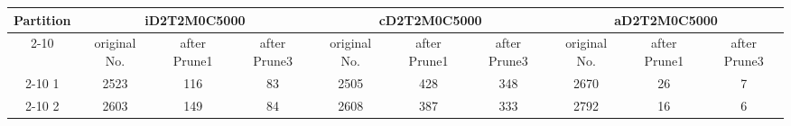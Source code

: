 \begin{table*}[t]
  \centering
\makeatletter
    \long{}
\makeatother
  \caption{2 partitions in Three Dimension}
    \vspace*{3pt}
  \footnotesize

  \label{table:partition4InThree}
  \begin{tabular}{|c||c|c|c|c|c|c|c|c|c|}
  \hline
  \multirow{2}{*}{Partition} &  \multicolumn{3}{|c|}{iD2T2M0C5000} & \multicolumn{3}{|c|}{cD2T2M0C5000} &\multicolumn{3}{|c|}{aD2T2M0C5000} \\\cline{2-10}
    &  original No. & after Prune1 & after Prune3 & original No. & after Prune1 & after Prune3 & original No. & after Prune1 & after Prune3\\\hline\hline

\cline{2-10}
    1 &  2523 & 116 & 83 & 2505 & 428 & 348 & 2670 & 26 & 7 \\\hline

\cline{2-10}
    2 &  2603 & 149 & 84 & 2608 & 387 & 333 & 2792 & 16 & 6 \\\hline
    
  \end{tabular}
  \vspace*{-17pt}
\end{table*}

